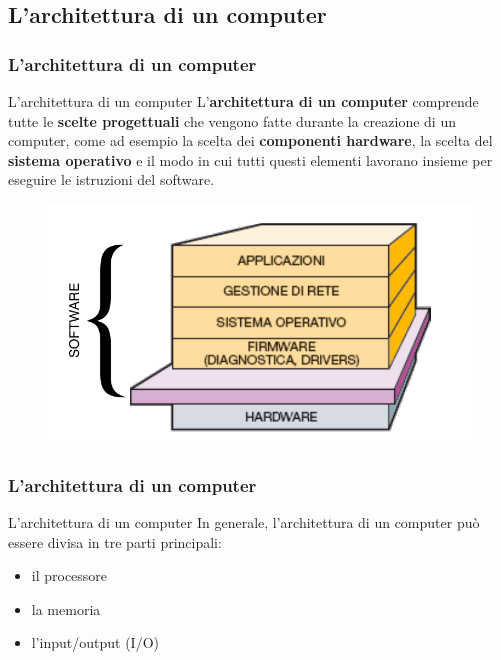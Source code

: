 	



\subsection[L'architettura di un computer]{L'architettura di un computer}
\begin{frame}
	\frametitle{L'architettura di un computer}
	
	\begin{block}{L'architettura di un computer}
		L'\textbf{architettura di un computer} comprende tutte le \textbf{scelte progettuali} che vengono fatte durante la creazione di un computer, come ad esempio la scelta dei \textbf{componenti hardware}, la scelta del \textbf{sistema operativo} e il modo in cui tutti questi elementi lavorano insieme per eseguire le istruzioni del software.
	\end{block}
	
	\begin{figure}[!htbp]
		\centering 
		\includegraphics[width=0.6\linewidth]{images/2_le_architetture/hd-sw.pdf}
	\end{figure}
	
\end{frame}


\begin{frame}
	\frametitle{L'architettura di un computer}
	
	\begin{block}{L'architettura di un computer}
		In generale, l'architettura di un computer può essere divisa in tre parti principali:
		\begin{itemize}
			\item il processore
			\item la memoria
			\item l'input/output (I/O)
		\end{itemize}
	\end{block}
	
	
\end{frame}


